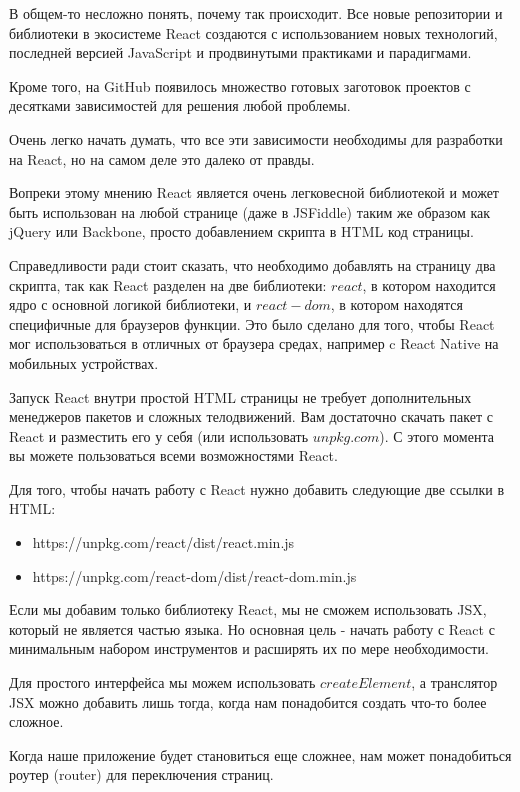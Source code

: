 В общем-то несложно понять, почему так происходит. Все новые репозитории и библиотеки в экосистеме React создаются с использованием новых технологий, последней версией JavaScript и продвинутыми практиками и парадигмами.

Кроме того, на GitHub появилось множество готовых заготовок проектов с десятками зависимостей для решения любой проблемы.

Очень легко начать думать, что все эти зависимости необходимы для разработки на React, но на самом деле это далеко от правды.

Вопреки этому мнению React является очень легковесной библиотекой и может быть использован на любой странице (даже в JSFiddle) таким же образом как jQuery или Backbone, просто добавлением скрипта в HTML код страницы.

Справедливости ради стоит сказать, что необходимо добавлять на страницу два скрипта, так как React разделен на две библиотеки: $react$, в котором находится ядро с основной логикой библиотеки, и $react-dom$, в котором находятся специфичные для браузеров функции. Это было сделано для того, чтобы React мог использоваться в отличных от браузера средах, например c React Native на мобильных устройствах.

Запуск React внутри простой HTML страницы не требует дополнительных менеджеров пакетов и сложных телодвижений. Вам достаточно скачать пакет с React и разместить его у себя (или использовать $unpkg.com$). С этого момента вы можете пользоваться всеми возможностями React.

Для того, чтобы начать работу с React нужно добавить следующие две ссылки в HTML:

\begin{itemize}
  \item https://unpkg.com/react/dist/react.min.js
  \item https://unpkg.com/react-dom/dist/react-dom.min.js
\end{itemize}

Если мы добавим только библиотеку React, мы не сможем использовать JSX, который не является частью языка. Но основная цель - начать работу с React с минимальным набором инструментов и расширять их по мере необходимости.

Для простого интерфейса мы можем использовать $createElement$, а транслятор JSX можно добавить лишь тогда, когда нам понадобится создать что-то более сложное.

Когда наше приложение будет становиться еще сложнее, нам может понадобиться роутер (router) для переключения страниц.

